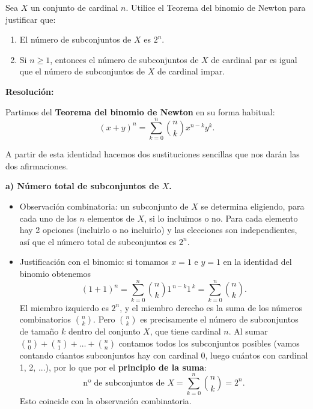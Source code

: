 \documentclass[a4paper,12pt]{article}
\begin{document}
\begin{ejercicio}[title=Ejercicio 23]
Sea $X$ un conjunto de cardinal $n$. Utilice el Teorema del binomio de Newton para justificar que:

\begin{enumerate}
\item[a)] El número de subconjuntos de $X$ es $2^n$.
\item[b)] Si $n \ge 1$, entonces el número de subconjuntos de $X$ de cardinal par es igual que el número de subconjuntos de $X$ de cardinal impar.
\end{enumerate}

\tcblower
\textbf{Resolución:}

Partimos del \textbf{Teorema del binomio de Newton} en su forma habitual:
\[
(x+y)^n=\sum_{k=0}^{n}\binom{n}{k}x^{n-k}y^{k}.
\]

A partir de esta identidad hacemos dos sustituciones sencillas que nos darán las dos afirmaciones.

\medskip

\textbf{a) Número total de subconjuntos de $X$.}

\begin{itemize}
\item Observación combinatoria: un subconjunto de $X$ se determina eligiendo, para cada uno de los $n$ elementos de $X$, si lo incluimos o no. Para cada elemento hay 2 opciones (incluirlo o no incluirlo) y las elecciones son independientes, así que el número total de subconjuntos es \(2^n\). 

\item Justificación con el binomio: si tomamos \(x=1\) e \(y=1\) en la identidad del binomio obtenemos
\[
(1+1)^n=\sum_{k=0}^{n}\binom{n}{k}1^{\,n-k}1^{\,k}
=\sum_{k=0}^{n}\binom{n}{k}.
\]
El miembro izquierdo es \(2^n\), y el miembro derecho es la suma de los números combinatorios \(\binom{n}{k}\). Pero \(\binom{n}{k}\) es precisamente el número de subconjuntos de tamaño \(k\) dentro del conjunto $X$, que tiene cardinal $n$. Al sumar \(\binom{n}{0}+\binom{n}{1}+\dots+\binom{n}{n}\) contamos todos los subconjuntos posibles (vamos contando cúantos subconjuntos hay con cardinal 0, luego cuántos con cardinal 1, 2, ...), por lo que por el \textbf{principio de la suma}:
\[
\text{nº de subconjuntos de }X=\boxed{\sum_{k=0}^{n}\binom{n}{k}=2^n
}.
\]
Esto coincide con la observación combinatoria.

\end{itemize}
\end{ejercicio}
\end{document}
